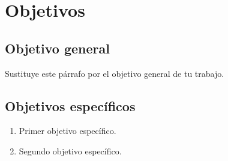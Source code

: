 \chapter{Objetivos}\label{cap:objetivos}

\section{Objetivo general}

Sustituye este párrafo por el objetivo general de tu trabajo.

\section{Objetivos específicos}

\begin{enumerate}
  \item Primer objetivo específico.
  \item Segundo objetivo específico.
\end{enumerate}
